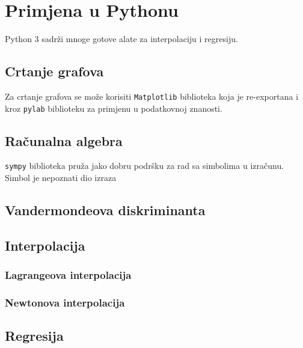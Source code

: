 \section{Primjena u Pythonu}

Python 3 sadrži mnoge gotove alate za interpolaciju i regresiju.

\subsection{Crtanje grafova}

Za crtanje grafova se može korisiti \verb|Matplotlib| biblioteka koja je
re-exportana i kroz \verb|pylab| biblioteku za primjenu u podatkovnoj znanosti.



\subsection{Računalna algebra}

\verb|sympy| biblioteka pruža jako dobru podršku za rad sa simbolima u izračunu.
Simbol je nepoznati dio izraza

\subsection{Vandermondeova diskriminanta}

\subsection{Interpolacija}

\subsubsection{Lagrangeova interpolacija}



\subsubsection{Newtonova interpolacija}


\subsection{Regresija}


